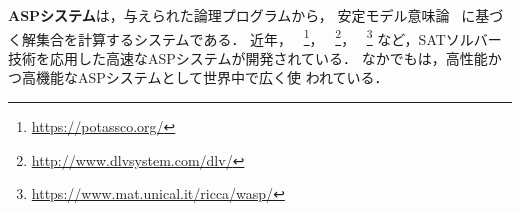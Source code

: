 \textbf{ASPシステム}は，与えられた論理プログラムから，
安定モデル意味論~\cite{Gelfond88:iclp}
に基づく解集合を計算するシステムである．
近年，
{\clingo}~\footnote{\url{https://potassco.org/}}，
{\dlv}~\footnote{\url{http://www.dlvsystem.com/dlv/}}，
{\wasp}~\footnote{\url{https://www.mat.unical.it/ricca/wasp/}}
など，SATソルバー技術を応用した高速なASPシステムが開発されている．
なかでも{\clingo}は，高性能かつ高機能なASPシステムとして世界中で広く使
われている．




